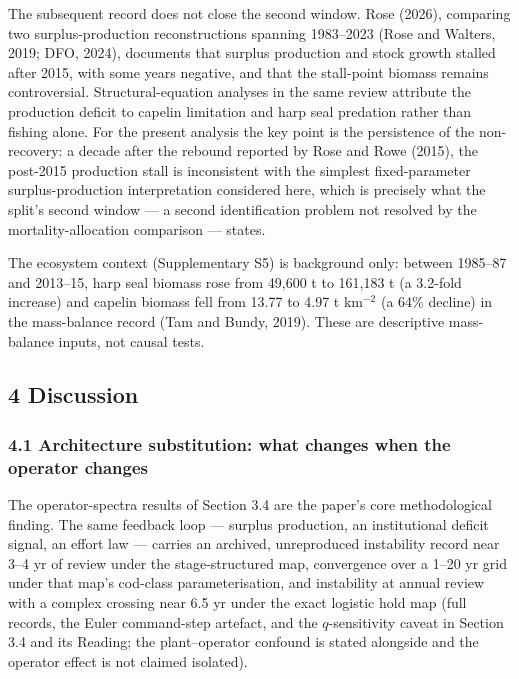 \documentclass[11pt]{article}
\begin{document}
The subsequent record does not close the second window. Rose (2026),
comparing two surplus-production reconstructions spanning 1983--2023
(Rose and Walters, 2019; DFO, 2024), documents that surplus production
and stock growth stalled after 2015, with some years negative, and that
the stall-point biomass remains controversial. Structural-equation
analyses in the same review attribute the production deficit to capelin
limitation and harp seal predation rather than fishing alone. For the
present analysis the key point is the persistence of the
non-recovery: a decade after the rebound reported by Rose and Rowe
(2015), the post-2015 production stall is inconsistent with the simplest
fixed-parameter surplus-production interpretation considered here, which
is precisely what the split's second window --- a second identification
problem not resolved by the mortality-allocation comparison --- states.

The ecosystem context (Supplementary S5) is background only: between 1985--87 and 2013--15,
harp seal biomass rose from 49,600 t to 161,183 t (a 3.2-fold increase)
and capelin biomass fell from 13.77 to 4.97 t km\(^{-2}\) (a 64\%
decline) in the mass-balance record (Tam and Bundy, 2019). These are
descriptive mass-balance inputs, not causal tests.

\subsection{4 Discussion}\label{discussion}

\subsubsection{4.1 Architecture substitution: what changes when the
operator
changes}\label{architecture-substitution-what-changes-when-the-operator-changes}

The operator-spectra results of Section 3.4 are the paper's core
methodological finding. The same feedback loop --- surplus production,
an institutional deficit signal, an effort law --- carries an archived,
unreproduced instability record near 3--4 yr of review under the
stage-structured map, convergence over a 1--20 yr grid under that map's
cod-class parameterisation, and instability at annual review with a
complex crossing near 6.5 yr under the exact logistic hold map (full
records, the Euler command-step artefact, and the \(q\)-sensitivity
caveat in Section 3.4 and its Reading; the plant--operator confound is
stated alongside and the operator effect is not claimed isolated).
\end{document}
